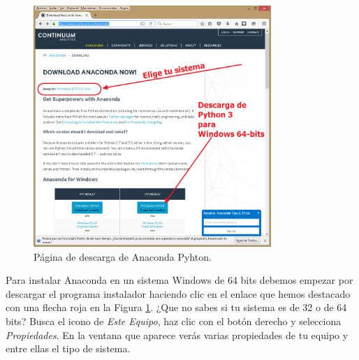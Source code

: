 \documentclass[10pt,a4paper]{article}\usepackage[]{graphicx}\usepackage[]{color}
\begin{document}
\begin{figure}[thb]
\begin{center}
\includegraphics[width=9cm]{../fig/Tut-00-py-01-Anaconda-a.png}
\caption{Página de descarga de Anaconda Pyhton.}
\label{cap01:fig:Tut-00-py-01-Anaconda}
\end{center}
\end{figure}

Para instalar Anaconda en un sistema Windows de 64 bits debemos empezar por descargar el programa instalador haciendo clic en el enlace que hemos destacado con una flecha roja en la Figura \ref{cap01:fig:Tut-00-py-01-Anaconda}. ¿Que no sabes si tu sistema es de 32 o de 64 bits?  Busca el icono de {\em Este Equipo}, haz clic con el botón derecho y selecciona {\em Propiedades}. En la ventana que aparece verás varias propiedades de tu equipo y entre ellas el tipo de sistema. 
\end{document}
